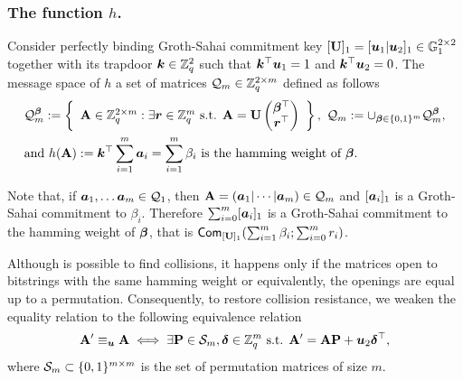 \subsubsection{The function $h$.} Consider perfectly binding Groth-Sahai commitment key $[\mathbf{{U}}]_1 = [{\boldsymbol{u}}_1|{\boldsymbol{u}}_2]_1\in\mathbb{G}_1^{2\times 2}$ together with its trapdoor ${\boldsymbol{k}}\in\mathbb{Z}_q^2$ such that ${\boldsymbol{k}}^\top{\boldsymbol{u}}_1 = 1$ and ${\boldsymbol{k}}^\top{\boldsymbol{u}}_2 = 0$. The message space of $h$ a set of matrices $\mathcal{Q}_m\in\mathbb{Z}_q^{2\times m}$ defined as follows
\begin{align*}
&\mathcal{Q}_m^{\boldsymbol{\beta}} := \left\{
\begin{array}{c}
\mathbf{{A}} \in \mathbb{Z}_q^{2\times m}:
\exists {\boldsymbol{r}}\in\mathbb{Z}_q^m\text{ s.t. }
{\mathbf{{A}} = \mathbf{{U}}\left(\begin{matrix}{\boldsymbol{\beta}}^\top\\{\boldsymbol{r}}^\top\end{matrix}\right)
}
\end{array}\right\},
\ \mathcal{Q}_m := \cup_{{\boldsymbol{\beta}}\in\{0,1\}^m} \mathcal{Q}_m^{\boldsymbol{\beta}},\\
&\text{and } h(\mathbf{{A}}):= {\boldsymbol{k}}^\top\sum_{i=1}^m{\boldsymbol{a}}_i = \sum_{i=1}^m \beta_i \text{ is the hamming weight of }{\boldsymbol{\beta}}.
\end{align*}

Note that, if ${\boldsymbol{a}}_1,\ldots {\boldsymbol{a}}_m\in\mathcal{Q}_{1}$, then $\matr{A} = (\vec{a}_1\cat\cdots\cat\vecb{a}_m)\in\mathcal{Q}_{m}$ and $[{\boldsymbol{a}}_i]_1$ is a Groth-Sahai commitment to $\beta_i$.
Therefore $\sum_{i=0}^m[{\boldsymbol{a}}_i]_1$ is a Groth-Sahai commitment to the hamming weight of ${\boldsymbol{\beta}}$, that is $\mathsf{Com}_{[\mathbf{{U}}]_1}(\sum_{i=1}^m \beta_i;\sum_{i=0}^m r_i)$.

Although is possible to find collisions, it happens only if the matrices open to bitstrings with the same hamming weight or equivalently, the openings are equal up to a permutation. Consequently, to restore collision resistance, we weaken the equality relation to the following equivalence relation
$$
\mathbf{{A}}' \equiv_{\boldsymbol{u}} \mathbf{{A}} \iff \exists \mathbf{{P}}\in\mathcal{S}_m, {\boldsymbol{\delta}}\in\mathbb{Z}_q^m \text{ s.t. } \mathbf{{A}}' = \mathbf{{A}}\mathbf{{P}} + {\boldsymbol{u}}_2{\boldsymbol{\delta}}^\top,
$$
where $\mathcal{S}_m\subset \{0,1\}^{m\times m}$ is the set of permutation matrices of size $m$.


